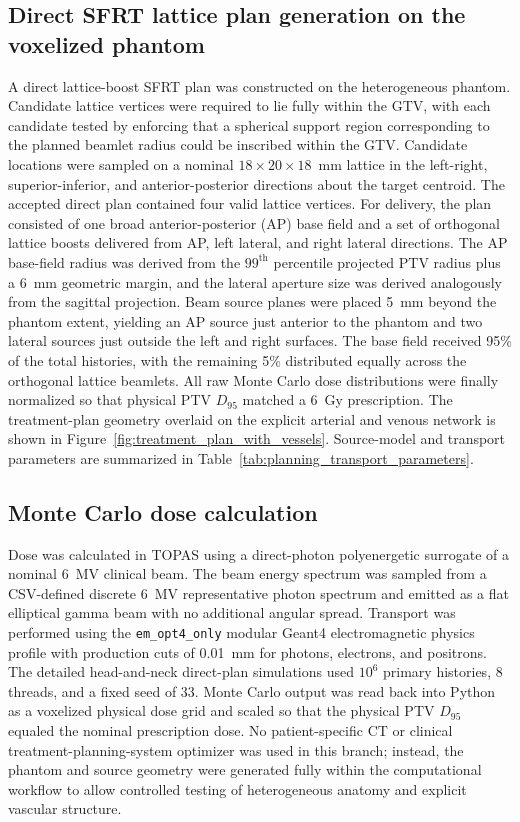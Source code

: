 \subsection{Direct SFRT lattice plan generation on the voxelized phantom}
A direct lattice-boost SFRT plan was constructed on the heterogeneous phantom. Candidate lattice vertices were required to lie fully within the GTV, with each candidate tested by enforcing that a spherical support region corresponding to the planned beamlet radius could be inscribed within the GTV. Candidate locations were sampled on a nominal $18 \times 20 \times 18$~mm lattice in the left-right, superior-inferior, and anterior-posterior directions about the target centroid. The accepted direct plan contained four valid lattice vertices. For delivery, the plan consisted of one broad anterior-posterior (AP) base field and a set of orthogonal lattice boosts delivered from AP, left lateral, and right lateral directions. The AP base-field radius was derived from the $99^\mathrm{th}$ percentile projected PTV radius plus a 6~mm geometric margin, and the lateral aperture size was derived analogously from the sagittal projection. Beam source planes were placed 5~mm beyond the phantom extent, yielding an AP source just anterior to the phantom and two lateral sources just outside the left and right surfaces. The base field received 95\% of the total histories, with the remaining 5\% distributed equally across the orthogonal lattice beamlets. All raw Monte Carlo dose distributions were finally normalized so that physical PTV $D_{95}$ matched a 6~Gy prescription. The treatment-plan geometry overlaid on the explicit arterial and venous network is shown in Figure~\ref{fig:treatment_plan_with_vessels}. Source-model and transport parameters are summarized in Table~\ref{tab:planning_transport_parameters}.

\subsection{Monte Carlo dose calculation}
Dose was calculated in TOPAS using a direct-photon polyenergetic surrogate of a nominal 6~MV clinical beam. The beam energy spectrum was sampled from a CSV-defined discrete 6~MV representative photon spectrum and emitted as a flat elliptical gamma beam with no additional angular spread. Transport was performed using the \texttt{em\_opt4\_only} modular Geant4 electromagnetic physics profile with production cuts of 0.01~mm for photons, electrons, and positrons. The detailed head-and-neck direct-plan simulations used $10^6$ primary histories, 8 threads, and a fixed seed of 33. Monte Carlo output was read back into Python as a voxelized physical dose grid and scaled so that the physical PTV $D_{95}$ equaled the nominal prescription dose. No patient-specific CT or clinical treatment-planning-system optimizer was used in this branch; instead, the phantom and source geometry were generated fully within the computational workflow to allow controlled testing of heterogeneous anatomy and explicit vascular structure.

